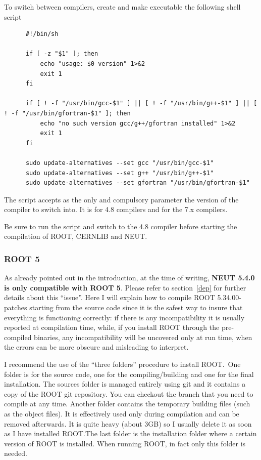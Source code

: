 To switch between compilers, create and make executable the following shell
script
\begin{lstlisting}
      #!/bin/sh

      if [ -z "$1" ]; then
          echo "usage: $0 version" 1>&2
          exit 1
      fi

      if [ ! -f "/usr/bin/gcc-$1" ] || [ ! -f "/usr/bin/g++-$1" ] || [ ! -f "/usr/bin/gfortran-$1" ]; then
          echo "no such version gcc/g++/gfortran installed" 1>&2
          exit 1
      fi

      sudo update-alternatives --set gcc "/usr/bin/gcc-$1"
      sudo update-alternatives --set g++ "/usr/bin/g++-$1"
      sudo update-alternatives --set gfortran "/usr/bin/gfortran-$1"
\end{lstlisting}
The script accepts as the only and compulsory parameter the version of the
compiler to switch into. It is  for 4.8 compilers and
 for the 7.x compilers.

Be sure to run the script and switch to the 4.8 compiler before starting the
compilation of ROOT, CERNLIB and NEUT.\@

\subsubsection{ROOT 5}\label{root5}
As already pointed out in the introduction, at the time of writing, \textbf{NEUT
  5.4.0 is only compatible with ROOT 5}. Please refer to section~\ref{dep} for
further details about this ``issue''.  Here I will explain how to compile ROOT
5.34.00-patches starting from the source code since it is the safest way to
insure that everything is functioning correctly: if there is any incompatibility
it is usually reported at compilation time, while, if you install ROOT through
the pre-compiled binaries, any incompatibility will be uncovered only at run
time, when the errors can be more obscure and misleading to interpret.

I recommend the use of the ``three folders'' procedure to install ROOT.\ One
folder is for the source code, one for the compiling/building and one for the
final installation. The sources folder is managed entirely using git and it
contains a copy of the ROOT git repository. You can checkout the branch that you
need to compile at any time. Another folder contains the temporary building
files (such as the object files). It is effectively used only during compilation
and can be removed afterwards. It is quite heavy (about 3GB) so I usually delete
it as soon as I have installed ROOT.\@ The last folder is the installation
folder where a certain version of ROOT is installed. When running ROOT, in fact
only this folder is needed.

